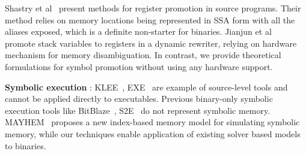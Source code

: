 Shastry et al~\cite{shastry-ssa} present methods for register promotion in source programs. Their method relies on memory locations being represented in SSA form with all the aliases exposed, which is a definite non-starter for binaries. Jianjun et al~\cite{dyn-reg-prom11} promote stack variables to registers in a dynamic rewriter, relying on hardware mechanism for memory disambiguation. In contrast, we provide theoretical formulations for symbol promotion without using any hardware support.

\textbf{Symbolic execution} : KLEE~\cite{Cadar-KLEE}, EXE~\cite{Cadar-EXE} are example of source-level tools and cannot be applied directly to executables. Previous binary-only symbolic execution tools like BitBlaze~\cite{Song-Bitblaze}, S2E~\cite{Chipounov-S2E} do not represent symbolic memory. MAYHEM~\cite{Brumley-Mayhem} proposes a new index-based memory model for simulating symbolic memory, while our techniques enable application of existing solver based models to binaries.
